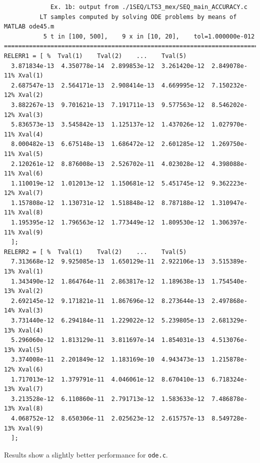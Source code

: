\documentclass[a4paper,10pt]{report}%
\begin{document}
\begin{lstlisting}
             Ex. 1b: output from ./1SEQ/LTS3_mex/SEQ_main_ACCURACY.c
          LT samples computed by solving ODE problems by means of MATLAB ode45.m
           5 t in [100, 500],    9 x in [10, 20],    tol=1.000000e-012
====================================================================================
RELERR1 = [ %  Tval(1)    Tval(2)    ...    Tval(5)
  3.871834e-13  4.350778e-14  2.899853e-12  3.261420e-12  2.849078e-11% Xval(1)
  2.687547e-13  2.564171e-13  2.908414e-13  4.669995e-12  7.150232e-12% Xval(2)
  3.882267e-13  9.701621e-13  7.191711e-13  9.577563e-12  8.546202e-12% Xval(3)
  5.836573e-13  3.545842e-13  1.125137e-12  1.437026e-12  1.027970e-11% Xval(4)
  8.000482e-13  6.675148e-13  1.686472e-12  2.601285e-12  1.269750e-11% Xval(5)
  2.120261e-12  8.876008e-13  2.526702e-11  4.023028e-12  4.398088e-11% Xval(6)
  1.110019e-12  1.012013e-12  1.150681e-12  5.451745e-12  9.362223e-12% Xval(7)
  1.157808e-12  1.130731e-12  1.518848e-12  8.787188e-12  1.310947e-11% Xval(8)
  1.195395e-12  1.796563e-12  1.773449e-12  1.809530e-12  1.306397e-11% Xval(9)
  ];
RELERR2 = [ %  Tval(1)    Tval(2)    ...    Tval(5)
  7.313668e-12  9.925085e-13  1.650129e-11  2.922106e-13  3.515389e-13% Xval(1)
  1.343490e-12  1.864764e-11  2.863817e-12  1.189638e-13  1.754540e-13% Xval(2)
  2.692145e-12  9.171821e-11  1.867696e-12  8.273644e-13  2.497868e-14% Xval(3)
  3.731440e-12  6.294184e-11  1.229022e-12  5.239805e-13  2.681329e-13% Xval(4)
  5.296060e-12  1.813129e-11  3.811697e-14  1.854031e-13  4.513076e-13% Xval(5)
  3.374008e-11  2.201849e-12  1.183169e-10  4.943473e-13  1.215878e-12% Xval(6)
  1.717013e-12  1.379791e-11  4.046061e-12  8.670410e-13  6.718324e-13% Xval(7)
  3.213528e-12  6.110860e-11  2.791713e-12  1.583633e-12  7.486878e-13% Xval(8)
  4.068752e-12  8.650306e-11  2.025623e-12  2.615757e-13  8.549728e-13% Xval(9)
  ];
\end{lstlisting}
Results show a slightly better performance for {\tt ode.c}.
\end{document}
